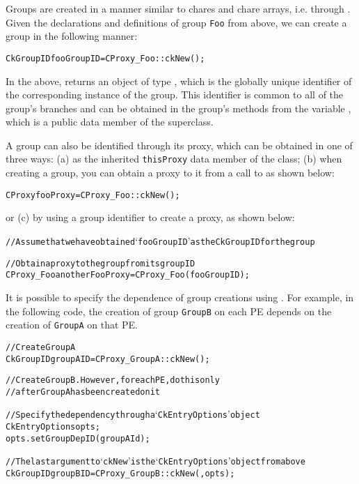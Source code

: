 Groups are created in a manner similar to chares and chare arrays, i.e. 
through . Given the declarations and definitions of group {\tt Foo}
from above, we can create a group in the following manner:

\begin{alltt}
CkGroupID fooGroupID = CProxy_Foo::ckNew();
\end{alltt}


In the above,  returns an object of type , which is
the globally unique identifier of the corresponding instance of the group.
This identifier is common to all of the group's branches and
can be obtained in the group's methods from the variable , which is a public data
member of the  superclass.

A group can also be identified through its proxy, which can be obtained in one of three ways:
(a) as the inherited {\tt thisProxy} data member of the class; (b) when creating a group,
you can obtain a proxy to it from a call to  
as shown below:

\begin{alltt}
CProxy fooProxy = CProxy_Foo::ckNew();
\end{alltt}

or (c) by using a group identifier to create a proxy, as shown below:

\begin{alltt}
// Assume that we have obtained `fooGroupID' as the CkGroupID for the group

// Obtain a proxy to the group from its group ID
CProxy_Foo anotherFooProxy = CProxy_Foo(fooGroupID);
\end{alltt}

It is possible to specify the dependence of group creations using
. For example, in the following code, the creation of group
{\tt GroupB} on each PE depends on the creation of {\tt GroupA} on that PE.

\begin{alltt}
// Create GroupA
CkGroupID groupAID = CProxy_GroupA::ckNew();

// Create GroupB. However, for each PE, do this only 
// after GroupA has been created on it

// Specify the dependency through a `CkEntryOptions' object
CkEntryOptions opts;
opts.setGroupDepID(groupAId);

// The last argument to `ckNew' is the `CkEntryOptions' object from above
CkGroupID groupBID = CProxy_GroupB::ckNew(, opts);
\end{alltt}

